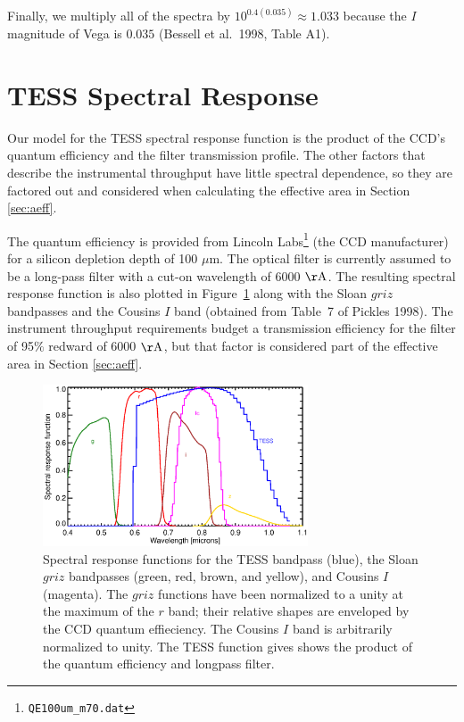 \documentclass[preprint,10pt]{aastex}
\begin{document}
Finally, we multiply all of the spectra by $10^{0.4(0.035)}\approx
1.033$ because the $I$ magnitude of Vega is $0.035$ (Bessell et al.\
1998, Table A1).

\section{TESS Spectral Response}

Our model for the TESS spectral response function is the product of the CCD's quantum efficiency and the filter transmission profile. The other factors that describe the instrumental throughput have little spectral dependence, so they are factored out and considered when calculating the effective area in Section \ref{sec:aeff}. 

The quantum efficiency is provided from Lincoln Labs\footnote{{\tt QE100um\_m70.dat}} (the CCD manufacturer) for a silicon depletion depth of 100 $\mu$m. The optical filter is currently assumed to be a long-pass filter with a cut-on wavelength of 6000 $\rm \AA$. The resulting spectral response function is also plotted in Figure~\ref{fig:bandpass} along with the Sloan $griz$ bandpasses and the Cousins $I$ band (obtained from Table~7 of Pickles 1998). The instrument throughput requirements budget a transmission efficiency for the filter of 95$\%$ redward of 6000 $\rm \AA$, but that factor is considered part of the effective area in Section \ref{sec:aeff}.
\begin{figure}
\begin{center}
\includegraphics[width=0.7\textwidth]{bandpass.eps}
\end{center}
\caption{Spectral response functions for the TESS bandpass (blue), the Sloan $griz$ bandpasses (green, red, brown, and yellow), and Cousins $I$ (magenta). The $griz$ functions have been normalized to
a unity at the maximum of the $r$ band; their relative shapes are enveloped by the CCD quantum effieciency. The Cousins $I$ band is arbitrarily normalized to unity. The TESS function gives shows the product of the quantum efficiency and longpass filter.}
\label{fig:bandpass}
\end{figure}
 
\end{document}
